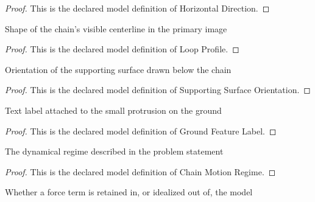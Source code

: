 \begin{proof}
  This is the declared model definition of Horizontal Direction.
\end{proof}
\begin{definition}
  \label{def:physics:phyx-mini-0244:phyxminiproblems-problemphyxmini0244-loopprofile}
  Shape of the chain's visible centerline in the primary image
\end{definition}
\begin{proof}
  This is the declared model definition of Loop Profile.
\end{proof}
\begin{definition}
  \label{def:physics:phyx-mini-0244:phyxminiproblems-problemphyxmini0244-supportingsurfaceorientation}
  Orientation of the supporting surface drawn below the chain
\end{definition}
\begin{proof}
  This is the declared model definition of Supporting Surface Orientation.
\end{proof}
\begin{definition}
  \label{def:physics:phyx-mini-0244:phyxminiproblems-problemphyxmini0244-groundfeaturelabel}
  Text label attached to the small protrusion on the ground
\end{definition}
\begin{proof}
  This is the declared model definition of Ground Feature Label.
\end{proof}
\begin{definition}
  \label{def:physics:phyx-mini-0244:phyxminiproblems-problemphyxmini0244-chainmotionregime}
  The dynamical regime described in the problem statement
\end{definition}
\begin{proof}
  This is the declared model definition of Chain Motion Regime.
\end{proof}
\begin{definition}
  \label{def:physics:phyx-mini-0244:phyxminiproblems-problemphyxmini0244-forcetermtreatment}
  Whether a force term is retained in, or idealized out of, the model
\end{definition}
